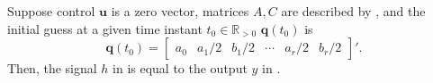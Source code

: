 \begin{highlight}
\begin{lem}\label{lem:eqv}Suppose control $\mathbf{u}$ is a zero vector, matrices $A,C$ are described by , and the initial guess at a given time instant $t_0\in\mathbb{R}_{>0}$ $\mathbf{q}(t_0)$ is 
  \begin{equation*}
  \mathbf{q}(t_0)=\begin{bmatrix}a_0 & a_1/2 & b_1/2 & \cdots & a_r/2 & b_r/2\end{bmatrix}'.
  \end{equation*} 
  Then, the signal $h$ in  is equal to the output $y$ in .
\end{lem}
\end{highlight}

